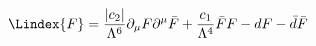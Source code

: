 \begin{equation}
  \label{eq:vyFlag2}
  \Lindex{F} = \frac{|c_2|}{\Lambda^6} \partial_\mu F \partial^\mu \bar{F} + \frac{c_1}{\Lambda^4} \bar{F} F - d F - \bar{d} \bar{F}
\end{equation}

